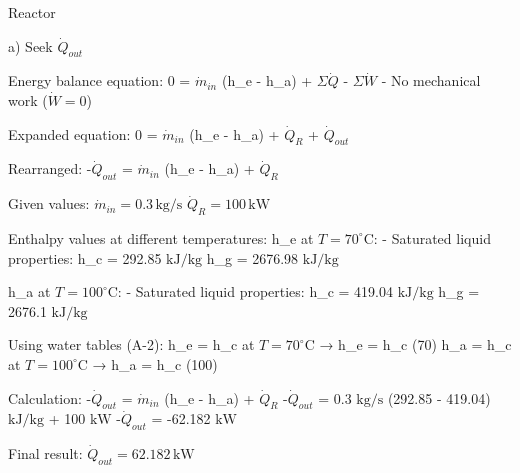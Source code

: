 Reactor  

a) Seek \( \dot{Q}_{out} \)  

Energy balance equation:  
0 = \( \dot{m}_{in} \) (h_e - h_a) + \( \Sigma \dot{Q} \) - \( \Sigma \dot{W} \)  
- No mechanical work (\( \dot{W} = 0 \))  

Expanded equation:  
0 = \( \dot{m}_{in} \) (h_e - h_a) + \( \dot{Q}_R \) + \( \dot{Q}_{out} \)  

Rearranged:  
-\( \dot{Q}_{out} \) = \( \dot{m}_{in} \) (h_e - h_a) + \( \dot{Q}_R \)  

Given values:  
\( \dot{m}_{in} = 0.3 \, \text{kg/s} \)  
\( \dot{Q}_R = 100 \, \text{kW} \)  

Enthalpy values at different temperatures:  
h_e at \( T = 70^\circ \text{C} \):  
- Saturated liquid properties:  
h_c = 292.85 \( \text{kJ/kg} \)  
h_g = 2676.98 \( \text{kJ/kg} \)  

h_a at \( T = 100^\circ \text{C} \):  
- Saturated liquid properties:  
h_c = 419.04 \( \text{kJ/kg} \)  
h_g = 2676.1 \( \text{kJ/kg} \)  

Using water tables (A-2):  
h_e = h_c at \( T = 70^\circ \text{C} \) → h_e = h_c (70)  
h_a = h_c at \( T = 100^\circ \text{C} \) → h_a = h_c (100)  

Calculation:  
-\( \dot{Q}_{out} \) = \( \dot{m}_{in} \) (h_e - h_a) + \( \dot{Q}_R \)  
-\( \dot{Q}_{out} \) = 0.3 \( \text{kg/s} \) (292.85 - 419.04) \( \text{kJ/kg} \) + 100 \( \text{kW} \)  
-\( \dot{Q}_{out} \) = -62.182 \( \text{kW} \)  

Final result:  
\( \dot{Q}_{out} = 62.182 \, \text{kW} \)